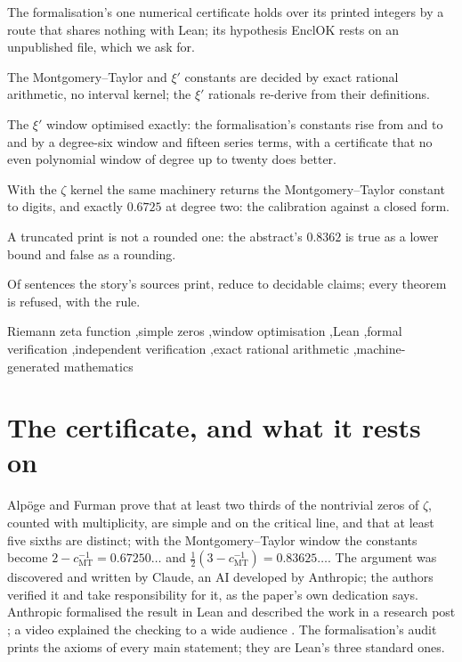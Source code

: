 \documentclass[preprint,11pt,authoryear,a4paper]{elsarticle}
\begin{document}
\begin{frontmatter}
\begin{highlights}
\item The formalisation's one numerical certificate holds over its printed integers by a route that shares nothing with Lean; its hypothesis EnclOK rests on an unpublished file, which we ask for.
\item The Montgomery--Taylor and $\xi'$ constants are decided by exact rational arithmetic, no interval kernel; the $\xi'$ rationals re-derive from their definitions.
\item The $\xi'$ window optimised exactly: the formalisation's constants rise from \RfLeanP{} and \RfLeanD{} to \RfNewP{} and \RfNewD{} by a degree-six window and fifteen series terms, with a certificate that no even polynomial window of degree up to twenty does better.
\item With the $\zeta$ kernel the same machinery returns the Montgomery--Taylor constant to \RfMtAgreeDigits{} digits, and exactly $0.6725$ at degree two: the calibration against a closed form.
\item A truncated print is not a rounded one: the abstract's $0.8362$ is true as a lower bound and false as a rounding.
\item Of \RfSentences{} sentences the story's sources print, \RfShaped{} reduce to decidable claims; every theorem is refused, with the rule.
\end{highlights}

\begin{keyword}
Riemann zeta function \sep simple zeros \sep window optimisation \sep Lean \sep formal verification \sep independent verification \sep exact rational arithmetic \sep machine-generated mathematics
\end{keyword}

\end{frontmatter}

\section{The certificate, and what it rests on}\label{sec:cert}

Alp\"oge and Furman \citep{AlpogeFurman26} prove that at least two thirds of the nontrivial zeros of $\zeta$, counted with multiplicity, are simple and on the critical line, and that at least five sixths are distinct; with the Montgomery--Taylor window \citep{Montgomery73,CCLM17} the constants become $2-c_{\mathrm{MT}}^{-1}=0.67250\ldots$ and $\tfrac12(3-c_{\mathrm{MT}}^{-1})=0.83625\ldots$. The argument was discovered and written by Claude, an AI developed by Anthropic; the authors verified it and take responsibility for it, as the paper's own dedication says. Anthropic formalised the result in Lean \citep{Zeta23Lean} and described the work in a research post \citep{AnthropicPost26}; a video explained the checking to a wide audience \citep{Video26}. The formalisation's audit prints the axioms of every main statement; they are Lean's three standard ones.
\end{document}
